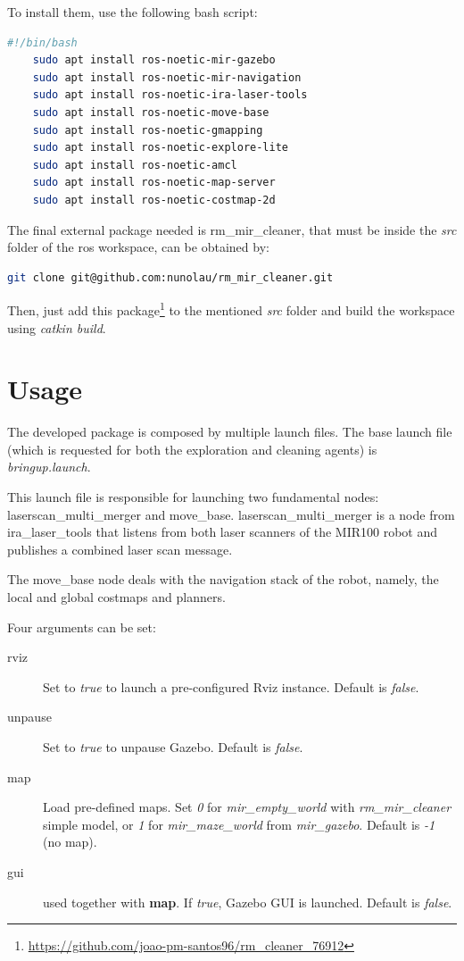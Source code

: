 \documentclass[]{article}
\begin{document}
To install them, use the following bash script:
%
\begin{lstlisting}[language=bash]
    #!/bin/bash
    sudo apt install ros-noetic-mir-gazebo
    sudo apt install ros-noetic-mir-navigation
    sudo apt install ros-noetic-ira-laser-tools
    sudo apt install ros-noetic-move-base
    sudo apt install ros-noetic-gmapping
    sudo apt install ros-noetic-explore-lite
    sudo apt install ros-noetic-amcl
    sudo apt install ros-noetic-map-server
    sudo apt install ros-noetic-costmap-2d
\end{lstlisting}
%
The final external package needed is rm\_mir\_cleaner, that must be inside the \textit{src} folder of the \gls{ros} workspace, can be obtained by:
%
\begin{lstlisting}[language=bash]
    git clone git@github.com:nunolau/rm_mir_cleaner.git
\end{lstlisting}

Then, just add this package\footnote{\url{https://github.com/joao-pm-santos96/rm_cleaner_76912}} to the mentioned \textit{src} folder and build the workspace using \textit{catkin build}.


\section{Usage}

The developed package is composed by multiple launch files. The base launch file (which is requested for both the exploration and cleaning agents) is \textit{bringup.launch}.

This launch file is responsible for launching two fundamental nodes: laserscan\_multi\_merger and move\_base. laserscan\_multi\_merger is a node from ira\_laser\_tools that listens from both laser scanners of the MIR100 robot and publishes a combined laser scan message. 

The move\_base node deals with the navigation stack of the robot, namely, the local and global costmaps and planners.

Four arguments can be set:

\begin{description}
    \item[rviz] Set to \textit{true} to launch a pre-configured Rviz instance. Default is \textit{false}.
    \item[unpause] Set to \textit{true} to unpause Gazebo. Default is \textit{false}.
    \item[map] Load pre-defined maps. Set \textit{0} for \textit{mir\_empty\_world} with \textit{rm\_mir\_cleaner} simple model, or \textit{1} for \textit{mir\_maze\_world} from \textit{mir\_gazebo}. Default is \textit{-1} (no map).
    \item[gui] used together with \textbf{map}. If \textit{true}, Gazebo GUI is launched. Default is \textit{false}.
\end{description}
\end{document}
